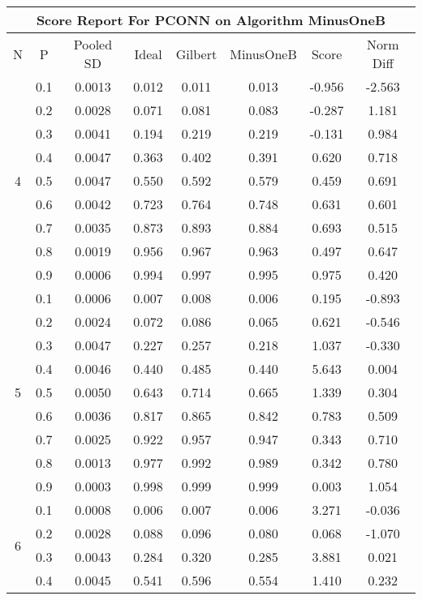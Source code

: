 \documentclass[11pt,a4paper]{report}
\begin{document}
\begin{longtable}{ | c | c || c | c | c | c | c | c | }
\hline
\multicolumn{8}{|c|}{ Score Report For PCONN on Algorithm MinusOneB} \\
\hline
N & P & Pooled SD &  Ideal &  Gilbert & MinusOneB  & Score & Norm Diff \\
 \hline
 \hline
 \endhead
\multirow{9}{*}{4} & 0.1 & 0.0013 & 0.012 & 0.011 & 0.013 & -0.956 & -2.563 \\
 & 0.2 & 0.0028 & 0.071 & 0.081 & 0.083 & -0.287 & 1.181 \\
 & 0.3 & 0.0041 & 0.194 & 0.219 & 0.219 & -0.131 & 0.984 \\
 & 0.4 & 0.0047 & 0.363 & 0.402 & 0.391 & 0.620 & 0.718 \\
 & 0.5 & 0.0047 & 0.550 & 0.592 & 0.579 & 0.459 & 0.691 \\
 & 0.6 & 0.0042 & 0.723 & 0.764 & 0.748 & 0.631 & 0.601 \\
 & 0.7 & 0.0035 & 0.873 & 0.893 & 0.884 & 0.693 & 0.515 \\
 & 0.8 & 0.0019 & 0.956 & 0.967 & 0.963 & 0.497 & 0.647 \\
 & 0.9 & 0.0006 & 0.994 & 0.997 & 0.995 & 0.975 & 0.420 \\
 \hline
\multirow{9}{*}{5} & 0.1 & 0.0006 & 0.007 & 0.008 & 0.006 & 0.195 & -0.893 \\
 & 0.2 & 0.0024 & 0.072 & 0.086 & 0.065 & 0.621 & -0.546 \\
 & 0.3 & 0.0047 & 0.227 & 0.257 & 0.218 & 1.037 & -0.330 \\
 & 0.4 & 0.0046 & 0.440 & 0.485 & 0.440 & 5.643 & 0.004 \\
 & 0.5 & 0.0050 & 0.643 & 0.714 & 0.665 & 1.339 & 0.304 \\
 & 0.6 & 0.0036 & 0.817 & 0.865 & 0.842 & 0.783 & 0.509 \\
 & 0.7 & 0.0025 & 0.922 & 0.957 & 0.947 & 0.343 & 0.710 \\
 & 0.8 & 0.0013 & 0.977 & 0.992 & 0.989 & 0.342 & 0.780 \\
 & 0.9 & 0.0003 & 0.998 & 0.999 & 0.999 & 0.003 & 1.054 \\
 \hline
\multirow{9}{*}{6} & 0.1 & 0.0008 & 0.006 & 0.007 & 0.006 & 3.271 & -0.036 \\
 & 0.2 & 0.0028 & 0.088 & 0.096 & 0.080 & 0.068 & -1.070 \\
 & 0.3 & 0.0043 & 0.284 & 0.320 & 0.285 & 3.881 & 0.021 \\
 & 0.4 & 0.0045 & 0.541 & 0.596 & 0.554 & 1.410 & 0.232 \\

\end{longtable}
\end{document}

